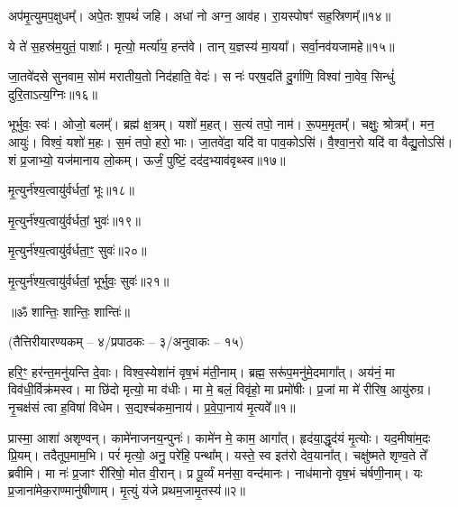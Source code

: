 अप॑मृ॒त्युमप॒क्षुधम्᳚।   अपे॒तः श॒पथं॑ जहि।
अधा॑ नो अग्न॒ आव॑ह।   रा॒यस्पोषꣳ॑ सह॒स्रिणम्᳚॥१४॥ 

ये ते॑ स॒हस्र॑म॒युतं॒ पाशाः᳚।   मृत्यो॒ मर्त्या॑य॒ हन्त॑वे।
तान् य॒ज्ञस्य॑ मा॒यया᳚।   सर्वा॒नव॑यजामहे॥१५॥ 

जा॒तवे॑दसे सुनवाम॒ सोम॑ मरातीय॒तो निद॑हाति॒ वेदः॑।
स नः॑ पर्‌ष॒दति॑ दु॒र्गाणि॒ विश्वा॑ ना॒वेव॒ सिन्धुं॑ दुरि॒ताऽत्य॒ग्निः॥१६॥ 

भूर्भुवः॒ स्वः॑।
ओजो॒ बलम्᳚।
ब्रह्म॑ क्ष॒त्रम्।
यशो॑ म॒हत्।
स॒त्यं तपो॒ नाम॑।
रू॒पम॒मृतम्᳚।
चक्षुः॒ श्रोत्रम्᳚।
मन॒ आयुः॑।
विश्वं॒ यशो॑ म॒हः।
स॒मं तपो॒ हरो॒ भाः।
जा॒तवे॑दा॒ यदि॑ वा पाव॒कोऽसि॑।
वै॒श्वा॒न॒रो यदि॑ वा वैद्यु॒तोऽसि॑।
शं प्र॒जाभ्यो॒ यज॑मानाय लो॒कम्।
ऊर्जं॒ पुष्टिं॒ दद॑द॒भ्याव॑वृथ्स्व॥१७॥ 
   
मृ॒त्युर्न॑श्य॒त्वायु॑र्वर्धतां॒ भूः॥१८॥ 

मृ॒त्युर्न॑श्य॒त्वायु॑र्वर्धतां॒ भुवः॑॥१९॥ 

मृ॒त्युर्न॑श्य॒त्वायु॑र्वर्धता॒ꣳ॒ सुवः॑॥२०॥  

मृ॒त्युर्न॑श्य॒त्वायु॑र्वर्धतां॒ भूर्भुवः॒ सुवः॑॥२१॥  

\centerline{॥ॐ शान्तिः॒ शान्तिः॒ शान्तिः॑॥}
\let\parskip\oldparskip

\closesub

\centerline{\scriptsize (तैत्तिरीयारण्यकम् – ४/प्रपाठकः – ३/अनुवाकः – १५)}
हरि॒ꣳ॒ हर॑न्त॒मनु॑यन्ति दे॒वाः। विश्व॒स्येशा॑नं वृष॒भं म॑ती॒नाम्। ब्रह्म॒ सरू॑प॒मनु॑मे॒दमागा᳚त्। अय॑नं॒ मा विव॑धी॒र्विक्र॑मस्व। मा छि॑दो मृत्यो॒ मा व॑धीः। मा मे॒ बलं॒  विवृ॑हो॒ मा प्रमो॑षीः। प्र॒जां मा मे॑ रीरिष॒ आयु॑रुग्र। नृ॒चक्ष॑सं त्वा ह॒विषा॑ विधेम। स॒द्यश्च॑कमा॒नाय॑। प्र॒वे॒पा॒नाय॑ मृ॒त्यवे᳚॥१॥

प्रास्मा॒ आशा॑ अशृण्वन्। कामे॑नाजनय॒न्पुनः॑। कामे॑न मे॒ काम॒ आगा᳚त्। हृद॑या॒द्धृद॑यं मृ॒त्योः। यद॒मीषा॑म॒दः प्रि॒यम्। तदैतूप॒माम॒भि। परं॑ मृत्यो॒ अनु॒ परे॑हि॒ पन्था᳚म्। यस्ते॒ स्व इत॑रो देव॒याना᳚त्। चक्षु॑ष्मते शृण्व॒ते ते᳚ ब्रवीमि। मा नः॑ प्र॒जाꣳ री॑रिषो॒ मोत वी॒रान्। प्र पू॒र्व्यं मन॑सा॒ वन्द॑मानः। नाध॑मानो वृष॒भं च॑र्\mbox{}षणी॒नाम्। यः प्र॒जाना॑मेक॒राण्मानु॑षीणाम्। मृ॒त्युं य॑जे प्रथम॒जामृ॒तस्य॑॥२॥

\hyperref[sec:start_Mrtyunjaya]{\closesection}